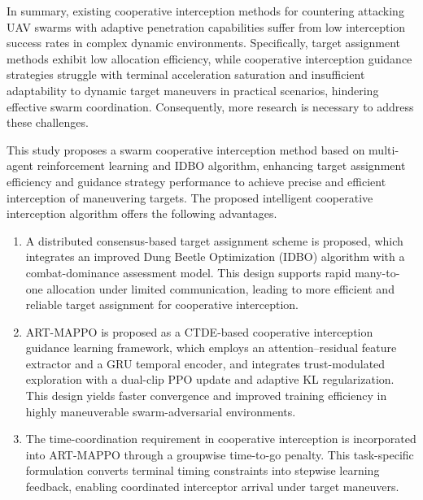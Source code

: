 \documentclass[lettersize,journal]{IEEEtran}
\begin{document}
In summary, existing cooperative interception methods for countering attacking UAV swarms with
adaptive penetration capabilities suffer from low interception success rates in complex dynamic
environments.
Specifically, target assignment methods exhibit low allocation efficiency, while cooperative
interception guidance strategies struggle with terminal acceleration saturation and insufficient
adaptability to dynamic target maneuvers in practical scenarios, hindering effective swarm
coordination.
Consequently, more research is necessary to address these challenges.

This study proposes a swarm cooperative interception method based on multi-agent reinforcement
learning and IDBO algorithm, enhancing target assignment efficiency and guidance strategy
performance to achieve precise and efficient interception of maneuvering targets.
The proposed intelligent cooperative interception algorithm offers the following advantages.

\begin{enumerate}
\item A distributed consensus-based target assignment scheme is proposed, which integrates an
improved Dung Beetle Optimization (IDBO) algorithm with a combat-dominance assessment model.
This design supports rapid many-to-one allocation under limited communication, leading to more
efficient and reliable target assignment for cooperative interception.

\item ART-MAPPO is proposed as a CTDE-based cooperative interception guidance learning
framework, which employs an attention--residual feature extractor and a GRU temporal encoder,
and integrates trust-modulated exploration with a dual-clip PPO update and adaptive KL
regularization. This design yields faster convergence and improved training efficiency in
highly maneuverable swarm-adversarial environments.


\item

The time-coordination requirement in cooperative interception is
incorporated into ART-MAPPO through a groupwise time-to-go penalty. This
task-specific formulation converts terminal timing constraints into
stepwise learning feedback, enabling coordinated interceptor arrival under
target maneuvers.


\end{enumerate}
\end{document}
